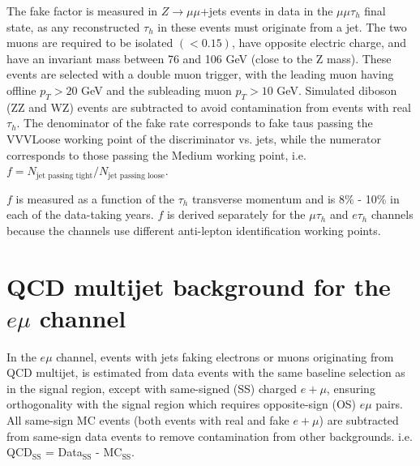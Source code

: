 The fake factor is measured in $Z \rightarrow \mu\mu$+jets events in data in the $\mu\mu\tau_{h}$ final state, as any reconstructed $\tau_{h}$ in these events must originate from a jet. The two muons are required to be isolated $(<0.15)$, have opposite electric charge, and have an invariant mass between 76 and 106 GeV (close to the Z mass). These events are selected with a double muon trigger, with the leading muon having offline $p_T > 20$ GeV and the subleading muon $p_{T} > 10$ GeV. Simulated diboson (ZZ and WZ) events are subtracted to avoid contamination from events with real $\tau_{h}$. The denominator of the fake rate corresponds to fake taus passing the VVVLoose working point of the discriminator vs. jets, while the numerator corresponds to those passing the Medium working point, i.e. $f = N_{\text{jet passing tight}}/ N_{\text{jet passing loose}}$.

$f$ is measured as a function of the $\tau_{h}$ transverse momentum and is 8\% - 10\% in each of the data-taking years. $f$ is derived separately for the $\mu\tau_{h}$ and $e\tau_{h}$ channels because the channels use different anti-lepton identification working points.

\section{QCD multijet background for the $e\mu$ channel}
In the $e\mu$ channel, events with jets faking electrons or muons originating from QCD multijet, is estimated from data events with the same baseline selection as in the signal region, except with same-signed (SS) charged $e+\mu$, ensuring orthogonality with the signal region which requires opposite-sign (OS) $e\mu$ pairs. All same-sign MC events (both events with real and fake $e+\mu$) are subtracted from same-sign data events to remove contamination from other backgrounds. i.e. QCD$_{\text{SS}}$ = Data$_{\text{SS}}$ - MC$_{\text{SS}}$.

